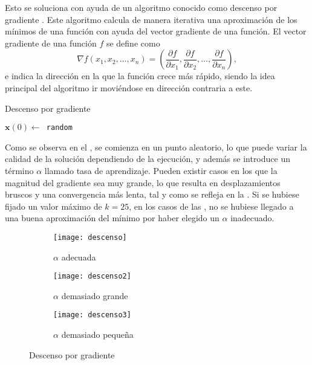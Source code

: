 		Esto se soluciona con ayuda de un algoritmo conocido como descenso por gradiente \cite{descenso}. Este algoritmo calcula de manera iterativa una aproximación de los mínimos de una función con ayuda del vector gradiente de una función. El vector gradiente de una función $f$ se define como 
		$$
		\nabla f(x_1, x_2, \hdots, x_n) = \left(\frac{\partial f}{\partial x_1}, \frac{\partial f}{\partial x_2}, \hdots, \frac{\partial f}{\partial x_n}\right), 
		$$
		e indica la dirección en la que la función crece más rápido, siendo la idea principal del algoritmo ir moviéndose en dirección contraria a este. 
		
		\begin{algorithm}
			\DontPrintSemicolon
			
			\caption{Descenso por gradiente}
			\label{algo:descenso}
			
			$\textbf{x}(0) \gets$\texttt{ random}\\
		\end{algorithm}
		
		Como se observa en el , se comienza en un punto aleatorio, lo que puede variar la calidad de la solución dependiendo de la ejecución, y además se introduce un término $\alpha$ llamado tasa de aprendizaje. Pueden existir casos en los que la magnitud del gradiente sea muy grande, lo que resulta en desplazamientos bruscos y una convergencia más lenta, tal y como se refleja en la . Si se hubiese fijado un valor máximo de $k = 25$, en los casos de las , no se hubiese llegado a una buena aproximación del mínimo por haber elegido un $\alpha$ inadecuado. 
		
		\begin{figure}[H]
			\centering
			\begin{subfigure}{.3\textwidth}
				\centering
				\texttt{[image: descenso]}
				\caption{$\alpha$ adecuada}
			\end{subfigure}
			\begin{subfigure}{.3\textwidth}
				\centering
				\texttt{[image: descenso2]}
				\caption{$\alpha$ demasiado grande}
				\label{fig:descenso_grande}
			\end{subfigure}
			\begin{subfigure}{.3\textwidth}
				\centering
				\texttt{[image: descenso3]}
				\caption{$\alpha$ demasiado pequeña}
				\label{fig:descenso_peq}
			\end{subfigure}
			\caption{Descenso por gradiente}
			\label{fig:descenso}
		\end{figure}
		

